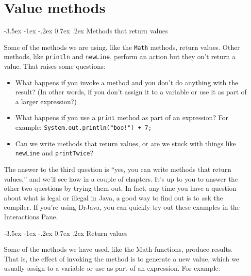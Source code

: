 \documentclass[12pt]{book}
\title{\thetitle}
\author{\theauthors}
\date{\theversion}
\makeatletter
\renewcommand{\section}{\@startsection {section}{1}{\z@}%
    {-3.5ex \@plus -1ex \@minus -.2ex}%
    {0.7ex \@plus.2ex}%
    {\normalfont\Large\bfseries}}
\theoremstyle{exercise}
\newcommand{\java}[1]{\lstinline{#1}} %
\makeatother
\begin{document}
\setcounter{chapter}{5}

\chapter{Value methods}
\label{chap05}


\section{Methods that return values}


Some of the methods we are using, like the {\tt Math} methods, return values.
Other methods, like {\tt println} and {\tt newLine}, perform an action but they on't return a value.
That raises some questions:

\begin{itemize}

\item What happens if you invoke a method and you don't do anything with the result?
(In other words, if you don't assign it to a variable or use it as part of a larger expression?)

\item What happens if you use a \java{print} method as part of an expression? For example: \java{System.out.println("boo!") + 7;}

\item Can we write methods that return values, or are we stuck with things like \java{newLine} and \java{printTwice}?

\end{itemize}

The answer to the third question is ``yes, you can write methods that return values,'' and we'll see how in a couple of chapters.
It's up to you to answer the other two questions by trying them out.
In fact, any time you have a question about what is legal or illegal in Java, a good way to find out is to ask the compiler.
If you're using DrJava, you can quickly try out these examples in the Interactions Pane.


\section{Return values}


Some of the methods we have used, like the Math functions, produce results.
That is, the effect of invoking the method is to generate a new value, which we usually assign to a variable or use as part of an expression.
For example:
\end{document}
